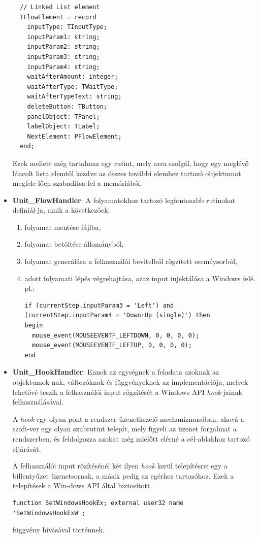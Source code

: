 \begin{itemize}
{\begin{lstlisting}
  // Linked List element
  TFlowElement = record
    inputType: TInputType;
    inputParam1: string;
    inputParam2: string;
    inputParam3: string;
    inputParam4: string;
    waitAfterAmount: integer;
    waitAfterType: TWaitType;
    waitAfterTypeText: string;
    deleteButton: TButton;
    panelObject: TPanel;
    labelObject: TLabel;
    NextElement: PFlowElement;
  end;
	\end{lstlisting}

	Ezek mellett még tartalmaz egy rutint, mely arra szolgál, hogy egy meglévő láncolt lista elemtől kezdve az összes további elemhez tartozó objektumot megfele\hyp{}lően szabadítsa fel a memóriából.

	}
	\item{
		\textbf{Unit\_FlowHandler}: A folyamatokhoz tartozó legfontosabb rutinokat definiál\hyp{}ja, amik a következőek:
		\begin{enumerate}
			\item{folyamat mentése fájlba,}
			\item{folyamat betöltése állományból,}
			\item{folyamat generálása a felhasználói bevitelből rögzített eseméysorból,}
			\item{adott folyamati lépés végrehajtása, azaz input injektálása a Windows felé. pl.:
				\begin{lstlisting}
if (currentStep.inputParam3 = 'Left') and
(currentStep.inputParam4 = 'Down+Up (single)') then
begin
  mouse_event(MOUSEEVENTF_LEFTDOWN, 0, 0, 0, 0);
  mouse_event(MOUSEEVENTF_LEFTUP, 0, 0, 0, 0);
end 
				\end{lstlisting}
			} 
			
		\end{enumerate}
	}
	\item{
		\textbf{Unit\_HookHandler}: Ennek az egységnek a feladata azoknak az objektumok\hyp{}nak, változóknak és függvényeknek az implementációja, melyek lehetővé teszik a felhasználói input rögzítését a Windows API \textit{hook}-jainak felhasználásával.

A \textit{hook} egy olyan pont a rendszer üzenetkezelő mechanizmusában, ahová a szoft\hyp{}ver egy olyan szubrutint telepít, mely figyeli az üzenet forgalmat a rendszerben, és feldolgozza azokat még mielőtt elérné a cél-ablakhoz tartozó eljárását.

A felhasználói input rözítésénél két ilyen \textit{hook} kerül telepítésre: egy a billentyűzet üzenetsornak, a másik pedig az egérhez tartozóhoz. Ezek a telepítések a Win\hyp{}dows API által biztosított
\begin{lstlisting}
function SetWindowsHookEx; external user32 name 'SetWindowsHookExW';
\end{lstlisting}
függvény hívásával történnek.

}
\end{itemize}
